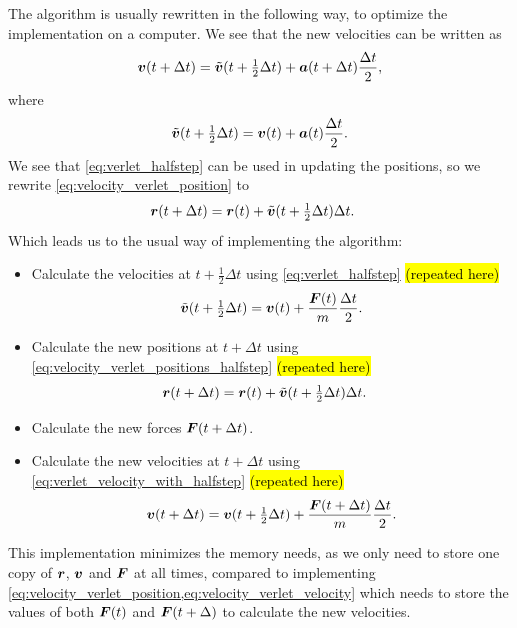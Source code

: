 The algorithm is usually rewritten in the following way, to optimize the implementation on a computer. We see that the new velocities can be written as
\begin{align}
    \boldsymbol{v}(t+\Delta t) = \tilde{\boldsymbol{v}}(t + \tfrac{1}{2}\Delta t) + \boldsymbol{a}(t+\Delta t)\frac{\Delta t}{2},\label{eq:verlet_velocity_with_halfstep}
\end{align}
where
\begin{align}
    \tilde{\boldsymbol{v}}(t + \tfrac{1}{2}\Delta t) = \boldsymbol{v}(t) + \boldsymbol{a}(t)\frac{\Delta t}{2}.\label{eq:verlet_halfstep}
\end{align}
We see that \cref{eq:verlet_halfstep} can be used in updating the positions, so we rewrite \cref{eq:velocity_verlet_position} to
\begin{align}
    \boldsymbol{r}(t + \Delta t) &= \boldsymbol{r}(t) + \tilde{\boldsymbol{v}}(t+\tfrac{1}{2}\Delta t)\Delta t.\label{eq:velocity_verlet_positions_halfstep}
\end{align}
Which leads us to the usual way of implementing the algorithm\cite{allen1989computer}:
\begin{itemize}
    \item Calculate the velocities at $t+\tfrac{1}{2}\Delta t$ using \cref{eq:verlet_halfstep} \hl{(repeated here)}
    \begin{align*}
        \tilde{\boldsymbol{v}}(t + \tfrac{1}{2}\Delta t) = \boldsymbol{v}(t) + \frac{\boldsymbol{F}(t)}{m}\frac{\Delta t}{2}.
    \end{align*}
    \item Calculate the new positions at $t + \Delta t$ using \cref{eq:velocity_verlet_positions_halfstep} \hl{(repeated here)}
    \begin{align*}
        \boldsymbol{r}(t + \Delta t) &= \boldsymbol{r}(t) + \tilde{\boldsymbol{v}}(t+\tfrac{1}{2}\Delta t)\Delta t.
    \end{align*}
    \item Calculate the new forces $\boldsymbol{F}(t+\Delta t)$.
    \item Calculate the new velocities at $t+\Delta t$ using \cref{eq:verlet_velocity_with_halfstep} \hl{(repeated here)}
    \begin{align*}
        \boldsymbol{v}(t+\Delta t) = \boldsymbol{v}(t + \tfrac{1}{2}\Delta t) + \frac{\boldsymbol{F}(t + \Delta t)}{m}\frac{\Delta t}{2}.
    \end{align*}
\end{itemize}
This implementation minimizes the memory needs, as we only need to store one copy of $\boldsymbol{r}$, $\boldsymbol{v}$ and $\boldsymbol{F}$ at all times, compared to implementing \cref{eq:velocity_verlet_position,eq:velocity_verlet_velocity} which needs to store the values of both $\boldsymbol{F}(t)$ and $\boldsymbol{F}(t+\Delta)$ to calculate the new velocities. 

